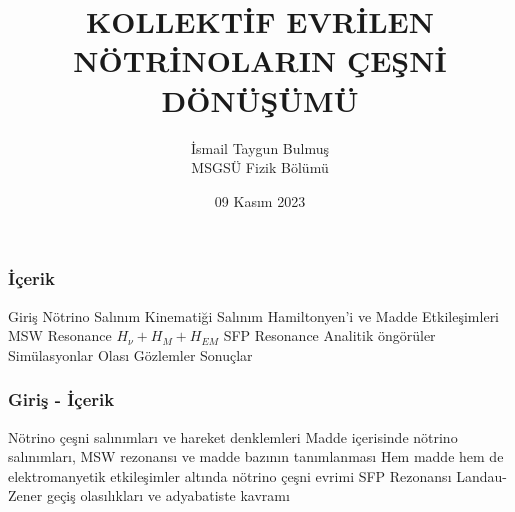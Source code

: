 \documentclass[10pt]{beamer}
\title[Kollektif Nötrino Salınımları]{\huge \textbf{KOLLEKTİF EVRİLEN NÖTRİNOLARIN ÇEŞNİ DÖNÜŞÜMÜ}\vspace{0.5cm}} %
\author{{\Large{İsmail Taygun Bulmuş}}\\MSGSÜ Fizik Bölümü\vspace{1cm}} %
\institute[MSGSÜ, Fizik Bölümü] %
{\vspace{1cm}
{\large \textbf{MSGSÜ Bölüm Semineri}}}
\date{09 Kasım 2023} %
\begin{document}
\shorthandoff{=}

\begin{frame}
\titlepage %
\end{frame}

\begin{frame}
    \frametitle{İçerik}
    \begin{outline}
        \1[\textbullet] Giriş
        \1[\textbullet] Nötrino Salınım Kinematiği
        \1[\textbullet] Salınım Hamiltonyen'i ve Madde Etkileşimleri
        \2[\textendash] MSW Resonance
        \1[\textbullet] $H_{\nu}+ H_{M}+ H_{EM}$
        \2[\textendash] SFP Resonance
        \1[\textbullet] Analitik öngörüler
        \1[\textbullet] Simülasyonlar
        \1[\textbullet] Olası Gözlemler
        \1[\textbullet] Sonuçlar
    \end{outline}
\end{frame}

\begin{frame}
    \frametitle{Giriş - İçerik}
    \begin{outline}
        \1[\textbullet] Nötrino çeşni salınımları ve hareket denklemleri
        \1[\textbullet] Madde içerisinde nötrino salınımları, MSW rezonansı ve madde bazının tanımlanması
        \1[\textbullet] Hem madde hem de elektromanyetik etkileşimler altında nötrino çeşni evrimi
        \2[\textendash] SFP Rezonansı
        \1[\textbullet] Landau-Zener geçiş olasılıkları ve adyabatiste kavramı
    \end{outline}
\end{frame}
\end{document}
